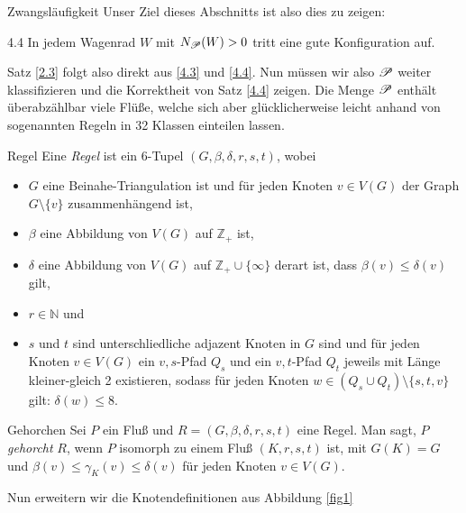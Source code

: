 \begin{section}{Zwangsläufigkeit}
 Unser Ziel dieses Abschnitts ist also dies zu zeigen:
 
 \begin{satzl}{ }{4.4}
  In jedem Wagenrad $W$ mit $N_{\mathscr{P}} (W) > 0$ tritt eine gute Konfiguration auf.
 \end{satzl}
 
 Satz \ref{2.3} folgt also direkt aus \ref{4.3} und \ref{4.4}. Nun müssen wir also $\mathscr{P}$ weiter klassifizieren und die Korrektheit von Satz \ref{4.4} zeigen. Die Menge $\mathscr{P}$ enthält überabzählbar viele Flüße, welche sich aber glücklicherweise leicht anhand von sogenannten Regeln in 32 Klassen einteilen lassen.
 
 \begin{definition}{Regel}
  Eine \textit{Regel} ist ein 6-Tupel $(G,\beta,\delta,r,s,t)$, wobei
  \begin{itemize}
   \item $G$ eine Beinahe-Triangulation ist und für jeden Knoten $v\in V(G)$ der Graph $G\setminus \{v\}$ zusammenhängend ist,
   \item $\beta$ eine Abbildung von $V(G)$ auf $\mathbb{Z}_+$ ist,
   \item $\delta$ eine Abbildung von $V(G)$ auf $\mathbb{Z}_+ \cup \{\infty\}$ derart ist, dass $\beta(v) \leq \delta(v)$ gilt, 
   \item $r \in \mathbb{N}$ und 
   \item $s$ und $t$ sind unterschliedliche adjazent Knoten in $G$ sind und für jeden Knoten $v\in V(G)$ ein $v,s$-Pfad $Q_s$ und ein $v,t$-Pfad $Q_t$ jeweils mit Länge kleiner-gleich 2 existieren, sodass für jeden Knoten $w \in (Q_s \cup Q_t)\setminus \{s,t,v\}$ gilt: $\delta(w) \leq 8$.
  \end{itemize}
 \end{definition}
 
 \begin{definition}{Gehorchen}
  Sei $P$ ein Fluß und $R=(G,\beta,\delta,r,s,t)$ eine Regel. Man sagt, $P$ \textit{gehorcht} $R$, wenn $P$ isomorph zu einem Fluß $(K,r,s,t)$ ist, mit $G(K) = G$ und $\beta(v) \leq \gamma_K(v) \leq \delta(v)$ für jeden Knoten $v \in V(G)$.
 \end{definition}
 
 Nun erweitern wir die Knotendefinitionen aus Abbildung \ref{fig1}



\end{section}